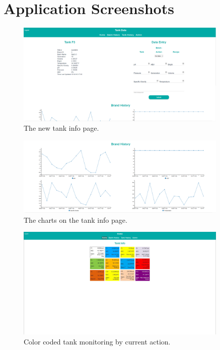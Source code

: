\documentclass[draftclsnofoot,onecolumn,journal,letterpaper,compsoc,10pt]{IEEEtran}
\begin{document}
\section{Application Screenshots}

\begin{figure}[H]
    \centering
    \includegraphics[width=0.9\textwidth]{screenshots/progress_report_screencap-tank_info.png}
    \caption{The new tank info page.}
\end{figure}

\begin{figure}[H]
    \centering
    \includegraphics[width=0.9\textwidth]{screenshots/progress_report_screencap-tank_info_charts.png}
    \caption{The charts on the tank info page.}
\end{figure}

\begin{figure}[H]
    \centering
    \includegraphics[width=0.9\textwidth]{screenshots/progress_report_screencap_tank_monitoring.JPG}
    \caption{Color coded tank monitoring by current action.}
\end{figure}
\end{document}
